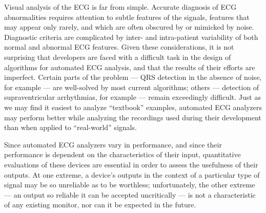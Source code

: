 \documentclass[twoside]{article}
\begin{document}
Visual analysis of the ECG is far from simple.  Accurate diagnosis of
ECG abnormalities requires attention to subtle features of the
signals, features that may appear only rarely, and which are often
obscured by or mimicked by noise.  Diagnostic criteria are complicated
by inter- and intra-patient variability of both normal and abnormal
ECG features.  Given these considerations, it is not surprising that
developers are faced with a difficult task in the design of algorithms
for automated ECG analysis, and that the results of their efforts are
imperfect.  Certain parts of the problem --- QRS detection in the
absence of noise, for example --- are well-solved by most current
algorithms;  others --- detection of supraventricular arrhythmias, for
example --- remain exceedingly difficult.  Just as we may find it easiest
to analyze ``textbook'' examples, automated ECG analyzers may perform
better while analyzing the recordings used during their development
than when applied to ``real-world'' signals.

Since automated ECG analyzers vary in performance, and since their
performance is dependent on the characteristics of their input,
quantitative evaluations of these devices are essential in order to
assess the usefulness of their outputs.  At one extreme, a device's
outputs in the context of a particular type of signal may be so
unreliable as to be worthless;  unfortunately, the other extreme ---
an output so reliable it can be accepted uncritically --- is not a
characteristic of any existing monitor, nor can it be expected in
the future.
\end{document}
